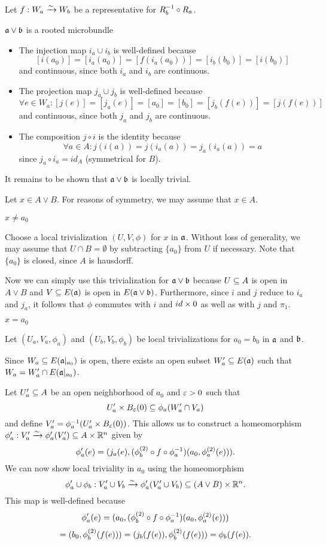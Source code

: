\begin{myproof} Let $f: W_a \xrightarrow{\sim} W_b$ be a representative for $R_b^{-1} \circ R_a$.

\begin{sectionize} \item $\ba \vee \bb$ is a rooted microbundle \begin{itemize} \item The injection map $i_a \cup i_b$ is well-defined because \[ [i(a_0)] = [i_a(a_0)] = [f(i_a(a_0))] = [i_b(b_0)] = [i(b_0)] \] and continuous, since both $i_a$ and $i_b$ are continuous. \item The projection map $j_a \cup j_b$ is well-defined because \[ \forall e \in W_a: [j(e)] = [j_a(e)] = [a_0] = [b_0] = [j_b(f(e))] = [j(f(e))] \] and continuous, since both $j_a$ and $j_b$ are continuous. \item The composition $j \circ i$ is the identity because \[ \forall a \in A: j(i(a)) = j(i_a(a)) = j_a(i_a(a)) = a \] since $j_a \circ i_a = id_A$ (symmetrical for $B$). \end{itemize} It remains to be shown that $\ba \vee \bb$ is locally trivial.

Let $x \in A \vee B$. For reasons of symmetry, we may assume that $x \in A$. \begin{caselist} \item $x \neq a_0$

Choose a local trivialization $(U, V, \phi)$ for $x$ in $\mathfrak{a}$. Without loss of generality, we may assume that $U \cap B = \emptyset$ by subtracting $\{a_0\}$ from $U$ if necessary. Note that $\{a_0\}$ is closed, since $A$ is hausdorff.

Now we can simply use this trivialization for $\ba \vee \bb$ because $U \subseteq{} A$ is open in $A \vee B$ and $V \subseteq{} E(\mathfrak{a})$ is open in $E(\ba \vee \bb)$. Furthermore, since $i$ and $j$ reduce to $i_a$ and $j_a$, it follows that $\phi$ commutes with $i$ and $id \times 0$ as well as with $j$ and $\pi_1$.

\item $x = a_0$

Let $(U_a, V_a, \phi_a)$ and $(U_b, V_b, \phi_b)$ be local trivializations for $a_0 = b_0$ in $\mathfrak{a}$ and $\bb$.

Since $W_a \subseteq{} E(\mathfrak{a}\vert_{a_0})$ is open, there exists an open subset $W_a' \subseteq{} E(\mathfrak{a})$ such that $W_a = W_a' \cap E(\mathfrak{a}\vert_{a_0})$.

Let $U_a' \subseteq{} A$ be an open neighborhood of $a_0$ and $\varepsilon{} > 0$ such that \[ U_a' \cross \ball[\eps] \sub \phi_a(W_a' \cap V_a) \] and define $V_a' = \inv{\phi_a}(U_a' \cross \ball[\eps])$. This allows us to construct a homeomorphism $\phi_a': V_a' \xrightarrow{\sim} \phi_a'(V_a') \subseteq{} A \times \mathbb{R}^n$ given by \[ \phi_a'(e) = (j_a(e), (\phi_b^{(2)} \circ f \circ \phi_a^{-1})(a_0, \phi_a^{(2)}(e))). \] We can now show local triviality in $a_0$ using the homeomorphism \[ \phi_a' \cup \phi_b: V_a' \cup V_b \xrightarrow{\sim} \phi_a'(V_a' \cup V_b) \subseteq{} (A \vee B) \times \mathbb{R}^n. \] This map is well-defined because \[ \phi_a'(e) = (a_0, (\phi_b^{(2)} \circ f \circ \phi_a^{-1})(a_0, \phi_a^{(2)}(e))) \] \[ = (b_0, \phi_b^{(2)}(f(e))) = (j_b(f(e)), \phi_b^{(2)}(f(e))) = \phi_b(f(e)). \]


\end{caselist}
\end{sectionize}
\end{myproof}

